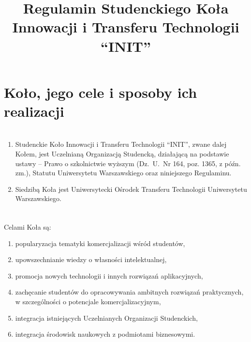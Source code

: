 \documentclass[a4paper]{article}
\author{}
\date{\vspace{-8ex}}
\title{Regulamin Studenckiego Koła Innowacji i Transferu Technologii \\``INIT''}
\begin{document}
\maketitle

\section*{Koło, jego cele i sposoby ich realizacji~~}
\section{}
\begin{enumerate}
\item Studenckie Koło Innowacji i Transferu Technologii ``INIT'', zwane dalej Kołem, jest Uczelnianą Organizacją Studencką, działającą na podstawie ustawy --  Prawo o szkolnictwie wyższym  (Dz.~U.~Nr 164, poz. 1365, z późn. zm.), Statutu Uniwersytetu Warszawskiego oraz niniejszego Regulaminu.

\item Siedzibą Koła jest Uniwersytecki Ośrodek Transferu Technologii Uniwersytetu Warszawskiego.
\end{enumerate}

\section{}

Celami Koła są:
\begin{enumerate}[label=\alph*)]
\item popularyzacja tematyki komercjalizacji wśród studentów,
\item upowszechnianie wiedzy o własności intelektualnej,
\item promocja nowych technologii i innych rozwiązań aplikacyjnych,%
\item zachęcanie studentów do opracowywania ambitnych rozwiązań praktycznych, w szczególności o potencjale komercjalizacyjnym,
\item integracja istniejących Uczelnianych Organizacji Studenckich,
\item integracja środowisk naukowych z podmiotami biznesowymi.
\end{enumerate}
\section{}
\end{document}
